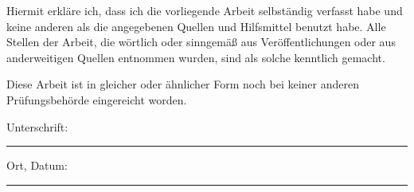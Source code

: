 \documentclass[
12pt, %
english, %
onehalfspacing, %
nolistspacing, %
liststotoc, %
parskip, %
headsepline, %
chapterinoneline, %
]{MastersDoctoralThesis} %
\begin{document}

\begin{declaration}
\addchaptertocentry{\authorshipname} %
Hiermit erkläre ich, dass ich die vorliegende Arbeit selbständig verfasst habe und keine anderen als die angegebenen Quellen und Hilfsmittel benutzt habe. Alle Stellen der Arbeit, die wörtlich oder sinngemäß aus Veröffentlichungen oder aus anderweitigen Quellen entnommen wurden, sind als solche kenntlich gemacht. 

Diese Arbeit ist in gleicher oder ähnlicher Form noch bei keiner anderen Prüfungsbehörde eingereicht worden.

\vspace{5mm}
\noindent Unterschrift:\\
\rule[0.5em]{25em}{0.5pt} %

 \vspace{5mm}
\noindent Ort, Datum:\\
\rule[0.5em]{25em}{0.5pt} %
\end{declaration}






\end{document}
